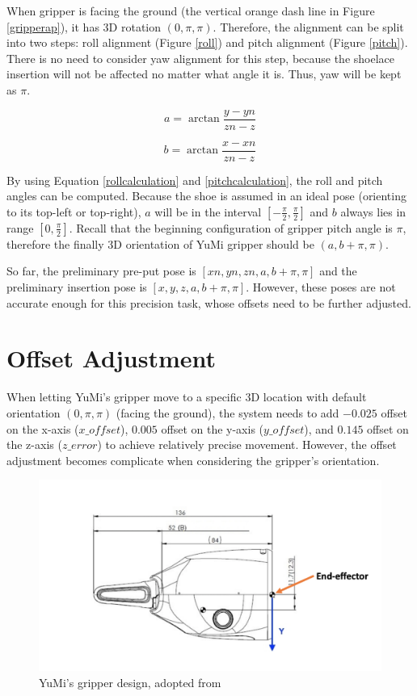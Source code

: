 When gripper is facing the ground (the vertical orange dash line in Figure \ref{gripperap}), it has 3D rotation $(0, \pi, \pi)$. Therefore, the alignment can be split into two steps: roll alignment (Figure \ref{roll}) and pitch alignment (Figure \ref{pitch}). There is no need to consider yaw alignment for this step, because the shoelace insertion will not be affected no matter what angle it is. Thus, yaw will be kept as $\pi$.

\begin{equation}
a = \arctan \frac{y - yn}{zn - z}
\label{rollcalculation}
\end{equation}

\begin{equation}
b = \arctan \frac{x - xn}{zn - z}
\label{pitchcalculation}
\end{equation}

By using Equation \ref{rollcalculation} and \ref{pitchcalculation}, the roll and pitch angles can be computed. Because the shoe is assumed in an ideal pose (orienting to its top-left or top-right), $a$ will be in the interval $[-\frac{\pi}{2}, \frac{\pi}{2}]$ and $b$ always lies in range $[0, \frac{\pi}{2}]$. Recall that the beginning configuration of gripper pitch angle is $\pi$, therefore the finally 3D orientation of YuMi gripper should be $(a, b + \pi, \pi)$. 

So far, the preliminary pre-put pose is $[xn, yn, zn, a, b + \pi, \pi]$ and the preliminary insertion pose is $[x, y, z, a, b + \pi, \pi]$. However, these poses are not accurate enough for this precision task, whose offsets need to be further adjusted.

\section{Offset Adjustment}
When letting YuMi's gripper move to a specific 3D location with default orientation $(0, \pi, \pi)$ (facing the ground), the system needs to add $-0.025$ offset on the x-axis ($x\_offset$), $0.005$ offset on the y-axis ($y\_offset$), and $0.145$ offset on the z-axis ($z\_error$) to achieve relatively precise movement. However, the offset adjustment becomes complicate when considering the gripper's orientation.

\begin{figure}[H]
\centering
\includegraphics[width = 0.8\columnwidth]{Implementation/mp/gripperoffset.png}
\caption{YuMi's gripper design, adopted from \citep{Productspecification}}
\label{gripperoffset}
\end{figure}

